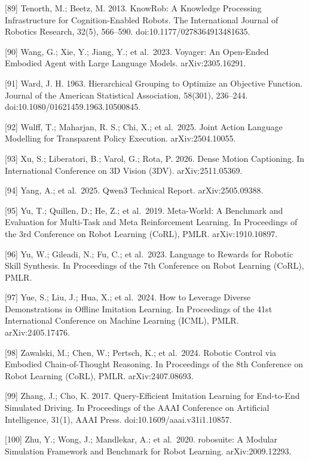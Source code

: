 \documentclass[
  11pt,
]{article}
\begin{document}
{[}89{]} Tenorth, M.; Beetz, M. 2013. KnowRob: A Knowledge Processing
Infrastructure for Cognition-Enabled Robots. The International Journal
of Robotics Research, 32(5), 566--590. doi:10.1177/0278364913481635.

{[}90{]} Wang, G.; Xie, Y.; Jiang, Y.; et al.~2023. Voyager: An
Open-Ended Embodied Agent with Large Language Models. arXiv:2305.16291.

{[}91{]} Ward, J. H. 1963. Hierarchical Grouping to Optimize an
Objective Function. Journal of the American Statistical Association,
58(301), 236--244. doi:10.1080/01621459.1963.10500845.

{[}92{]} Wulff, T.; Maharjan, R. S.; Chi, X.; et al.~2025. Joint Action
Language Modelling for Transparent Policy Execution. arXiv:2504.10055.

{[}93{]} Xu, S.; Liberatori, B.; Varol, G.; Rota, P. 2026. Dense Motion
Captioning. In International Conference on 3D Vision (3DV).
arXiv:2511.05369.

{[}94{]} Yang, A.; et al.~2025. Qwen3 Technical Report.
arXiv:2505.09388.

{[}95{]} Yu, T.; Quillen, D.; He, Z.; et al.~2019. Meta-World: A
Benchmark and Evaluation for Multi-Task and Meta Reinforcement Learning.
In Proceedings of the 3rd Conference on Robot Learning (CoRL), PMLR.
arXiv:1910.10897.

{[}96{]} Yu, W.; Gileadi, N.; Fu, C.; et al.~2023. Language to Rewards
for Robotic Skill Synthesis. In Proceedings of the 7th Conference on
Robot Learning (CoRL), PMLR.

{[}97{]} Yue, S.; Liu, J.; Hua, X.; et al.~2024. How to Leverage Diverse
Demonstrations in Offline Imitation Learning. In Proceedings of the 41st
International Conference on Machine Learning (ICML), PMLR.
arXiv:2405.17476.

{[}98{]} Zawalski, M.; Chen, W.; Pertsch, K.; et al.~2024. Robotic
Control via Embodied Chain-of-Thought Reasoning. In Proceedings of the
8th Conference on Robot Learning (CoRL), PMLR. arXiv:2407.08693.

{[}99{]} Zhang, J.; Cho, K. 2017. Query-Efficient Imitation Learning for
End-to-End Simulated Driving. In Proceedings of the AAAI Conference on
Artificial Intelligence, 31(1), AAAI Press.
doi:10.1609/aaai.v31i1.10857.

{[}100{]} Zhu, Y.; Wong, J.; Mandlekar, A.; et al.~2020. robosuite: A
Modular Simulation Framework and Benchmark for Robot Learning.
arXiv:2009.12293.
\end{document}
